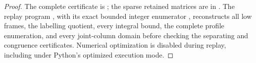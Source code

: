 \begin{proof}
The complete certificate is
; the sparse
retained matrices are in
.
The replay program , with its exact
bounded integer enumerator , reconstructs
all low frames, the labelling quotient, every integral bound, the complete
profile enumeration, and every joint-column domain before checking the
separating and congruence certificates. Numerical optimization is disabled
during replay, including under Python's optimized execution mode.
\end{proof}
